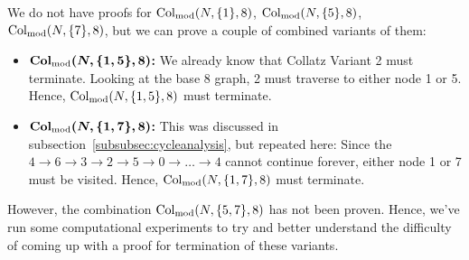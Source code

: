We do not have proofs for $\mathrm{Col}_{\text{mod}}(N,\{1\},8)$, $\mathrm{Col}_{\text{mod}}(N,\{5\},8)$, $\mathrm{Col}_{\text{mod}}(N,\{7\},8)$, but we can prove a couple of combined variants of them:
\begin{itemize}
    \item \textbf{$\boldsymbol{\mathrm{Col}_{\text{mod}}(N,\{1,5\},8)}$:} We already know that Collatz Variant 2 must terminate. Looking at the base 8 graph, 2 must traverse to either node 1 or 5. Hence, $\mathrm{Col}_{\text{mod}}(N,\{1,5\},8)$ must terminate.
    \item \textbf{$\boldsymbol{\mathrm{Col}_{\text{mod}}(N,\{1,7\},8)}$:} This was discussed in subsection~\ref{subsubsec:cycleanalysis}, but repeated here: Since the $4 \rightarrow 6 \rightarrow 3 \rightarrow 2 \rightarrow 5 \rightarrow 0 \rightarrow \ldots \rightarrow 4$ cannot continue forever, either node 1 or 7 must be visited. Hence, $\mathrm{Col}_{\text{mod}}(N,\{1,7\},8)$ must terminate.
\end{itemize}
However, the combination $\mathrm{Col}_{\text{mod}}(N,\{5,7\},8)$ has not been proven. Hence, we've run some computational experiments to try and better understand the difficulty of coming up with a proof for termination of these variants. 
